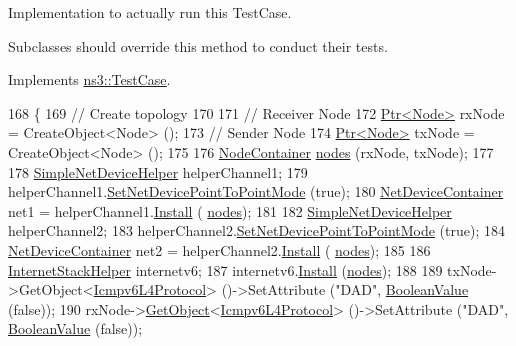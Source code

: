Implementation to actually run this Test\+Case. 

Subclasses should override this method to conduct their tests. 

Implements \hyperlink{classns3_1_1TestCase_a8ff74680cf017ed42011e4be51917a24}{ns3\+::\+Test\+Case}.


\begin{DoxyCode}
168 \{
169   \textcolor{comment}{// Create topology}
170 
171   \textcolor{comment}{// Receiver Node}
172   \hyperlink{classns3_1_1Ptr}{Ptr<Node>} rxNode = CreateObject<Node> ();
173   \textcolor{comment}{// Sender Node}
174   \hyperlink{classns3_1_1Ptr}{Ptr<Node>} txNode = CreateObject<Node> ();
175 
176   \hyperlink{classns3_1_1NodeContainer}{NodeContainer} \hyperlink{visualizer-ideas_8txt_a3e1b3808014a2c68ab0cd0182e041be2}{nodes} (rxNode, txNode);
177 
178   \hyperlink{classns3_1_1SimpleNetDeviceHelper}{SimpleNetDeviceHelper} helperChannel1;
179   helperChannel1.\hyperlink{classns3_1_1SimpleNetDeviceHelper_a474460ba6942d4933f443a97df7d4716}{SetNetDevicePointToPointMode} (\textcolor{keyword}{true});
180   \hyperlink{classns3_1_1NetDeviceContainer}{NetDeviceContainer} net1 = helperChannel1.\hyperlink{classns3_1_1SimpleNetDeviceHelper_a35bed9cee32d306362d3e24dfeef4513}{Install} (
      \hyperlink{visualizer-ideas_8txt_a3e1b3808014a2c68ab0cd0182e041be2}{nodes});
181 
182   \hyperlink{classns3_1_1SimpleNetDeviceHelper}{SimpleNetDeviceHelper} helperChannel2;
183   helperChannel2.\hyperlink{classns3_1_1SimpleNetDeviceHelper_a474460ba6942d4933f443a97df7d4716}{SetNetDevicePointToPointMode} (\textcolor{keyword}{true});
184   \hyperlink{classns3_1_1NetDeviceContainer}{NetDeviceContainer} net2 = helperChannel2.\hyperlink{classns3_1_1SimpleNetDeviceHelper_a35bed9cee32d306362d3e24dfeef4513}{Install} (
      \hyperlink{visualizer-ideas_8txt_a3e1b3808014a2c68ab0cd0182e041be2}{nodes});
185 
186   \hyperlink{classns3_1_1InternetStackHelper}{InternetStackHelper} internetv6;
187   internetv6.\hyperlink{classns3_1_1InternetStackHelper_a6645b412f31283d2d9bc3d8a95cebbc0}{Install} (\hyperlink{visualizer-ideas_8txt_a3e1b3808014a2c68ab0cd0182e041be2}{nodes});
188 
189   txNode->GetObject<\hyperlink{classns3_1_1Icmpv6L4Protocol}{Icmpv6L4Protocol}> ()->SetAttribute (\textcolor{stringliteral}{"DAD"}, 
      \hyperlink{classns3_1_1BooleanValue}{BooleanValue} (\textcolor{keyword}{false}));
190   rxNode->\hyperlink{classns3_1_1Object_a13e18c00017096c8381eb651d5bd0783}{GetObject}<\hyperlink{classns3_1_1Icmpv6L4Protocol}{Icmpv6L4Protocol}> ()->SetAttribute (\textcolor{stringliteral}{"DAD"}, 
      \hyperlink{classns3_1_1BooleanValue}{BooleanValue} (\textcolor{keyword}{false}));

\end{DoxyCode}
